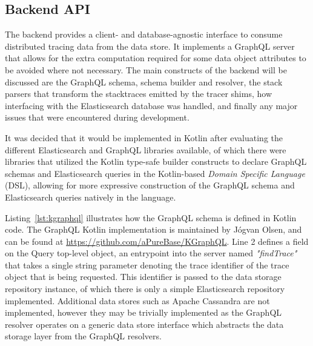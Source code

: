 \documentclass[12pt,pdftex,titlepage]{report}
\begin{document}
            \subsection{Backend API}
            \label{sec:backend}
                The backend provides a client- and database-agnostic interface to consume distributed tracing data from the data store. It implements a GraphQL server that allows for the extra computation
                required for some data object attributes to be avoided where not necessary. The main constructs of the backend will be discussed are the GraphQL schema, schema builder and resolver, the stack
                parsers that transform the stacktraces emitted by the tracer shims, how interfacing with the Elasticsearch database was handled, and finally any major issues that were encountered during development.

                It was decided that it would be implemented in Kotlin after evaluating the different Elasticsearch and GraphQL libraries available, of which there were libraries 
                that utilized the Kotlin type-safe builder constructs\cite{dsl} to declare GraphQL schemas and Elasticsearch queries in the Kotlin-based \textit{Domain Specific Language} (DSL), allowing
                for more expressive construction of the GraphQL schema and Elasticsearch queries natively in the language. 
                
                Listing~\ref{lst:kgraphql} illustrates how the GraphQL schema is defined in Kotlin code. The GraphQL Kotlin implementation is maintained by Jógvan Olsen, and can be found at 
                \url{https://github.com/aPureBase/KGraphQL}. Line 2 defines a field on the Query top-level object, an entrypoint into the server named \textit{"findTrace"} that takes a single string parameter 
                denoting the trace identifier of the trace object that is being requested. This identifier is passed to the data storage repository instance, of which there is only a simple Elasticsearch 
                repository implemented. Additional data stores such as Apache Cassandra are not implemented, however they may be trivially implemented as the GraphQL resolver operates on a generic data store 
                interface which abstracts the data storage layer from the GraphQL resolvers.
\end{document}
